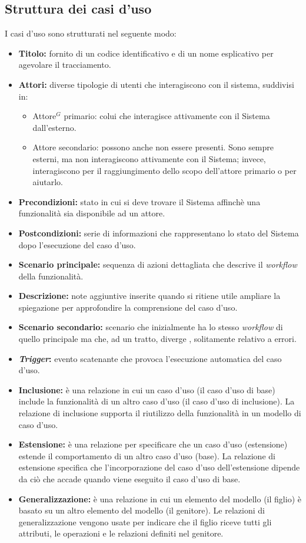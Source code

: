 \subsection{Struttura dei casi d'uso}
I casi d'uso sono strutturati nel seguente modo:
\begin{itemize}
	\item \textbf{Titolo:} fornito di un codice identificativo e di un nome esplicativo per agevolare il tracciamento.
	\item \textbf{Attori:} diverse tipologie di utenti che interagiscono con il sistema, suddivisi in:
	      \begin{itemize}
		      \item Attore$^G$ primario: colui che interagisce attivamente con il Sistema dall'esterno.
		      \item Attore secondario: possono anche non essere presenti.
		            Sono sempre esterni, ma non interagiscono attivamente con il Sistema; invece, interagiscono per il raggiungimento dello scopo dell'attore primario o per aiutarlo.
	      \end{itemize}
	\item \textbf{Precondizioni:} stato in cui si deve trovare il Sistema affinchè una funzionalità sia disponibile ad un attore.
	\item \textbf{Postcondizioni:} serie di informazioni che rappresentano lo stato del Sistema dopo l'esecuzione del caso d'uso.
	\item \textbf{Scenario principale:} sequenza di azioni dettagliata che descrive il \textit{workflow} della funzionalità.
	\item \textbf{Descrizione:} note aggiuntive inserite quando si ritiene utile ampliare la spiegazione per approfondire la comprensione del caso d'uso.
	\item \textbf{Scenario secondario:} scenario che inizialmente ha lo stesso \textit{workflow} di quello principale ma che, ad un tratto, diverge , solitamente relativo a errori.
	\item \textbf{\textit{Trigger}:} evento scatenante che provoca l'esecuzione automatica del caso d'uso.
	\item \textbf{Inclusione:} è una relazione in cui un caso d'uso (il caso d'uso di base) include la funzionalità di un altro caso d'uso (il caso d'uso di inclusione).
	      La relazione di inclusione supporta il riutilizzo della funzionalità in un modello di caso d'uso.
	\item \textbf{Estensione:} è una relazione per specificare che un caso d'uso (estensione) estende il comportamento di un altro caso d'uso (base).
	      La relazione di estensione specifica che l'incorporazione del caso d'uso dell'estensione dipende da ciò che accade quando viene eseguito il caso d'uso di base.
	\item \textbf{Generalizzazione:} è una relazione in cui un elemento del modello (il figlio) è basato su un altro elemento del modello (il genitore).
	      Le relazioni di generalizzazione vengono usate per indicare che il figlio riceve tutti gli attributi, le operazioni e le relazioni definiti nel genitore.
\end{itemize}

